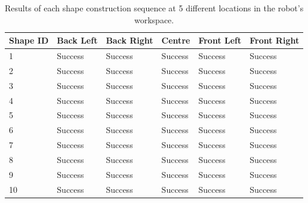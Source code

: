 \begin{table}[H]
	\renewcommand{\arraystretch}{1.3}
	\centering
	\begin{tabular}{|>{\raggedright}m{2cm}|>{\raggedright}m{2cm}|>{\raggedright}m{2cm}|>{\raggedright}m{2cm}|>{\raggedright}m{2cm}|>{\raggedright\arraybackslash}m{2cm}|}
		\hline
		\textbf{Shape ID} & \textbf{Back Left} & \textbf{Back Right} & \textbf{Centre} & \textbf{Front Left} & \textbf{Front Right} \\
		\hline
		1 & Success & Success & Success & Success & Success  \\ \hline
		2 & Success & Success & Success & Success & Success  \\ \hline
		3 & Success & Success & Success & Success & Success  \\ \hline
		4 & Success & Success & Success & Success & Success  \\ \hline
		5 & Success & Success & Success & Success & Success  \\ \hline
		6 & Success & Success & Success & Success & Success  \\ \hline
		7 & Success & Success & Success & Success & Success  \\ \hline
		8 & Success & Success & Success & Success & Success  \\ \hline
		9 & Success & Success & Success & Success & Success  \\ \hline
		10 & Success & Success & Success & Success & Success  \\ \hline
	\end{tabular}
	\caption{\label{tab:techdoc-qtp1-results}Results of each shape construction sequence at 5 different locations in the robot's workspace.}
\end{table}


